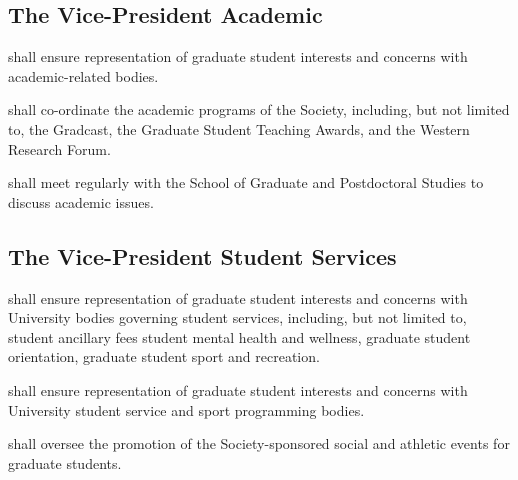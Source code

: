 \subsection {The Vice-President Academic} 
\begin{longenum}[ label*=\thesubsection.\arabic*., align=left]
	\item shall ensure representation of graduate student interests and concerns with academic-related bodies.
    \item shall co-ordinate the academic programs of the Society, including, but not limited to, the Gradcast, the Graduate Student Teaching Awards, and the Western Research Forum.
    \item shall meet regularly with the School of Graduate and Postdoctoral Studies to discuss academic issues.
\end{longenum}


\subsection {The Vice-President Student Services} 
\begin{longenum}[ label*=\thesubsection.\arabic*., align=left]
	\item shall ensure representation of graduate student interests and concerns with
	University bodies governing student services, including, but not limited to, student ancillary fees student mental health and wellness, graduate student orientation, graduate student sport and recreation.
    \item shall ensure representation of graduate student interests and concerns with University student service and sport programming bodies.
    \item shall oversee the promotion of the Society-sponsored social and athletic events for graduate students.
\end{longenum}

